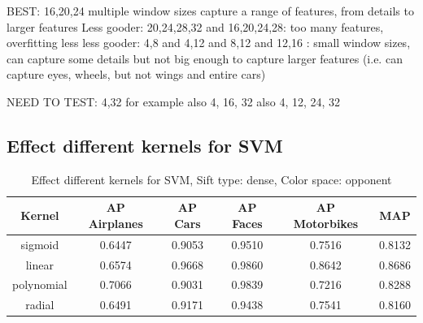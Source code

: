 BEST: 16,20,24
multiple window sizes capture a range of features, from details to larger features
Less gooder: 20,24,28,32 and 16,20,24,28: too many features, overfitting
less less gooder: 4,8 and 4,12 and 8,12 and 12,16 : small window sizes, can capture some details but not big enough to capture larger features (i.e. can capture eyes, wheels, but not wings and entire cars)

NEED TO TEST: 4,32 for example
also 4, 16, 32
also 4, 12, 24, 32




\subsection{Effect different kernels for SVM}

\begin{table}[H]
\begin{tabular}{|c|ccccc|}
\hline
\textbf{Kernel} & \textbf{AP Airplanes} & \textbf{AP Cars} & \textbf{AP Faces} & \textbf{AP Motorbikes} & \textbf{MAP}\\
\hline
sigmoid & 0.6447 & 0.9053 & 0.9510 & 0.7516 & 0.8132\\
linear & 0.6574 & 0.9668 & 0.9860 & 0.8642 & 0.8686 \\
polynomial & 0.7066 & 0.9031 & 0.9839& 0.7216& 0.8288\\
radial & 0.6491 & 0.9171 & 0.9438 & 0.7541 & 0.8160\\
\hline
\end{tabular}
\caption{Effect different kernels for SVM, Sift type: dense, Color space: opponent}
\end{table}
